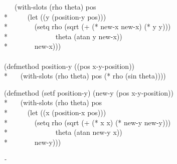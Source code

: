 \begin{defun}
\begin{lisp}
~~~(with-slots (rho theta) pos \\*
~~~~~(let ((y (position-y pos))) \\*
~~~~~~~(setq rho (sqrt (+ (* new-x new-x) (* y y))) \\*
~~~~~~~~~~~~~theta (atan y new-x)) \\*
~~~~~~~new-x))) \\
\\
(defmethod position-y ((pos x-y-position)) \\*
~~~(with-slots (rho theta) pos (* rho (sin theta))))
\end{lisp}
\begin{lisp}
(defmethod (setf position-y) (new-y (pos x-y-position)) \\*
~~~(with-slots (rho theta) pos \\*
~~~~~(let ((x (position-x pos))) \\*
~~~~~~~(setq rho (sqrt (+ (* x x) (* new-y new-y))) \\*
~~~~~~~~~~~~~theta (atan new-y x)) \\*
~~~~~~~new-y)))
\end{lisp}
\end{defun}

\newbox\hyphbox
\setbox\hyphbox\hbox{\it -}
\def\foohyphen{\copy\hyphbox}

